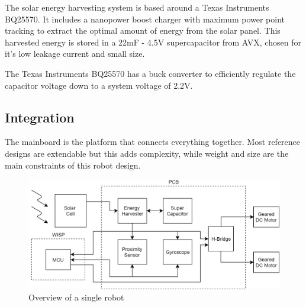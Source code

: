 
The solar energy harvesting system is based around a Texas Instruments BQ25570. 
It includes a nanopower boost charger with maximum power point tracking to extract the optimal amount of energy from the solar panel. 
This harvested energy is stored in a 22mF - 4.5V supercapacitor from AVX, chosen for it's low leakage current and small size.

The Texas Instruments BQ25570 has a buck converter to efficiently regulate the capacitor voltage down to a system voltage of 2.2V.


\subsection{Integration}



The mainboard is the platform that connects everything together.
Most reference designs are extendable but this adds complexity, while weight and size are the main constraints of this robot design.



\begin{figure}
	\centering
	\includegraphics[width=\textwidth]{pics/schematic_robot_v2.png}
	\caption{Overview of a single robot}
	\label{fig:system_overview}
\end{figure}

